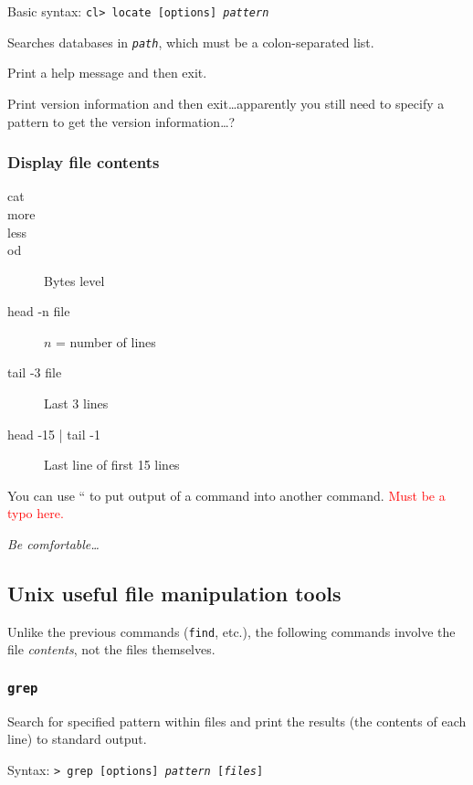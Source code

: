 \documentclass{article}
\newcommand{\test}[1]{%
    \begin{center}
        \colorbox{hl}{\parbox{0.9\textwidth}{\emph{#1}}}
    \end{center}}
\begin{document}
Basic syntax: \texttt{cl> locate [options] \textit{pattern}}
\begin{description}[labelwidth=15em,leftmargin=15em]
    \item [-d \textit{path}, --database=\textit{path}]
        Searches databases in \texttt{\textit{path}}, which must be
        a colon-separated list.
    \item [-h, --help] Print a help message and then exit.
    \item [--version] Print version information and then
        exit\ldots apparently you still need to specify a pattern to
        get the version information\ldots ?
\end{description}

\subsubsection{Display file contents}
\begin{description}
    \item [cat]
    \item [more]
    \item [less]
    \item [od] Bytes level
    \item [head -n file] $n$ = number of lines
    \item [tail -3 file] Last 3 lines
    \item [head -15 | tail -1] Last line of first 15 lines
\end{description}
You can use `` to put output of a command into another command.
\textcolor{red}{Must be a typo here.}

\test{Be comfortable\ldots}

\subsection{Unix useful file manipulation tools}
Unlike the previous commands (\texttt{find}, etc.), the following
commands involve the file \emph{contents}, not the files themselves.

\subsubsection{\texttt{grep}}
Search for specified pattern within files and print the results
(the contents of each line) to standard output.

Syntax: \texttt{> grep [options] \textit{pattern} [\textit{files}]}
\end{document}
